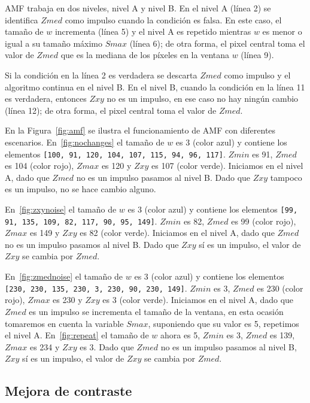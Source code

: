 AMF trabaja en dos niveles, nivel A y nivel B. En el nivel A (línea 2) se
identifica $Zmed$ como impulso cuando la condición es falsa. En este caso, el
tamaño de $w$ incrementa (línea 5) y el nivel A es repetido mientras $w$ es
menor o igual a su tamaño máximo $Smax$ (línea 6); de otra forma, el pixel
central toma el valor de $Zmed$ que es la mediana de los píxeles en la ventana
$w$ (línea 9).

Si la condición en la línea 2 es verdadera se descarta $Zmed$ como impulso y el
algoritmo continua en el nivel B. En el nivel B, cuando la condición en la
línea 11 es verdadera, entonces $Zxy$ no es un impulso, en ese caso no hay
ningún cambio (línea 12); de otra forma, el pixel central toma el valor de
$Zmed$.

\shorthandoff{>} %
    
\shorthandon{>}

En la Figura~\ref{fig:amf} se ilustra el funcionamiento de AMF con diferentes
escenarios. En~\ref{fig:nochanges} el tamaño de $w$ es 3 (color azul) y
contiene los elementos \texttt{[100, 91, 120, 104, 107, 115, 94, 96, 117]}.
$Zmin$ es 91, $Zmed$ es 104 (color rojo), $Zmax$ es 120 y $Zxy$ es 107 (color
verde). Iniciamos en el nivel A, dado que $Zmed$ no es un impulso pasamos al
nivel B. Dado que $Zxy$ tampoco es un impulso, no se hace cambio alguno.

En~\ref{fig:zxynoise} el tamaño de $w$ es 3 (color azul) y contiene los
elementos \texttt{[99, 91, 135, 109, 82, 117, 90, 95, 149]}. $Zmin$ es 82,
$Zmed$ es 99 (color rojo), $Zmax$ es 149 y $Zxy$ es 82 (color verde). Iniciamos
en el nivel A, dado que $Zmed$ no es un impulso pasamos al nivel B. Dado que
$Zxy$ sí es un impulso, el valor de $Zxy$ se cambia por $Zmed$.

En~\ref{fig:zmednoise} el tamaño de $w$ es 3 (color azul) y contiene los
elementos \texttt{[230, 230, 135, 230, 3, 230, 90, 230, 149]}. $Zmin$ es 3,
$Zmed$ es 230 (color rojo), $Zmax$ es 230 y $Zxy$ es 3 (color verde). Iniciamos
en el nivel A, dado que $Zmed$ es un impulso se incrementa el tamaño de la
ventana, en esta ocasión tomaremos en cuenta la variable $Smax$, suponiendo que
su valor es 5, repetimos el nivel A. En~\ref{fig:repeat} el tamaño de $w$ ahora
es 5, $Zmin$ es 3, $Zmed$ es 139, $Zmax$ es 234 y $Zxy$ es 3. Dado que $Zmed$
no es un impulso pasamos al nivel B, $Zxy$ sí es un impulso, el valor de $Zxy$
se cambia por $Zmed$.

\subsection{Mejora de contraste}

